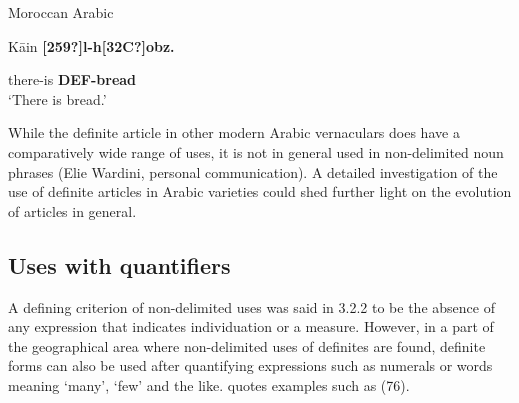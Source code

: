 
\item 

Moroccan Arabic



K\=ain  \textbf{[259?]l-h[32C?]obz.}



there-is  \textbf{DEF-bread}\\

\glt ‘There is bread.’

\z

While the definite article in other modern Arabic vernaculars does have a comparatively wide range of uses, it is not in general used in non-delimited noun phrases (Elie Wardini, personal communication). A detailed investigation of the use of definite articles in Arabic varieties could shed further light on the evolution of articles in general.


\subsection{\rmfamily Uses with quantifiers}
\label{bkm:Ref114303795}
A defining criterion of non-delimited uses was said in 3.2.2 to be the absence of any expression that indicates individuation or a measure. However, in a part of the geographical area where non-delimited uses of definites are found, definite forms can also be used after quantifying expressions such as numerals or words meaning ‘many’, ‘few’ and the like. \citet{Delsing2003a} quotes examples such as (76).


\item 

